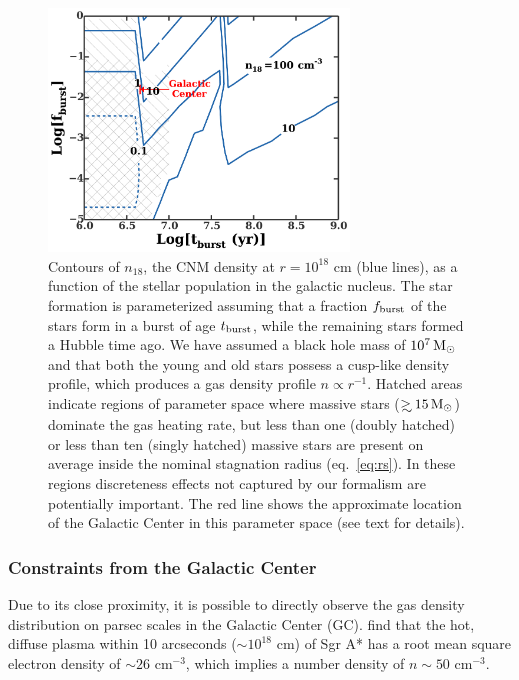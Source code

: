\documentclass[usenatbib,fleqn]{mnras}
\newcommand\gsim{\mathrel{\rlap{\lower4pt\hbox{\hskip1pt$\sim$}}
    \raise1pt\hbox{$>$}}}
\newcommand{\Msun}{{\rm M_\odot}}
\begin{document}
\begin{figure} 
  \includegraphics[width=8cm]{cnm_plot.pdf}
  \caption{\label{fig:param} Contours of $n_{18}$, the CNM density at
    $r = 10^{18}$ cm (blue lines), as a function of the stellar
    population in the galactic nucleus.  The star formation is
    parameterized assuming that a fraction $f_{\rm burst}$ of the
    stars form in a burst of age $t_{\rm burst}$, while the remaining
    stars formed a Hubble time ago.  We have assumed a black hole mass
    of $10^{7} \, \Msun$ and that both the young and old stars possess
    a cusp-like density profile, which produces a gas density profile
    $n \propto r^{-1}$.  Hatched areas indicate regions of parameter
    space where massive stars ($\gsim 15 \, \Msun$) dominate the gas
    heating rate, but less than one (doubly hatched) or less than ten
    (singly hatched) massive stars are present on average inside the
    nominal stagnation radius (eq.~\ref{eq:rs}).  In these regions
    discreteness effects not captured by our formalism are potentially
    important. The red line shows the approximate location of the
    Galactic Center in this parameter space (see text for details).}
\end{figure}


\subsubsection{Constraints from the Galactic Center}
\label{sec:empirical}

Due to its close proximity, it is possible to directly observe the gas
density distribution on parsec scales in the Galactic Center
(GC). \citet{Baganoff+2003} find that the hot, diffuse plasma within
10 arcseconds ($\sim 10^{18}$ cm) of Sgr A* has a root mean square
electron density of $\sim 26$ cm$^{-3}$, which implies a number
density of $n\sim 50$ cm$^{-3}$. 
\end{document}
